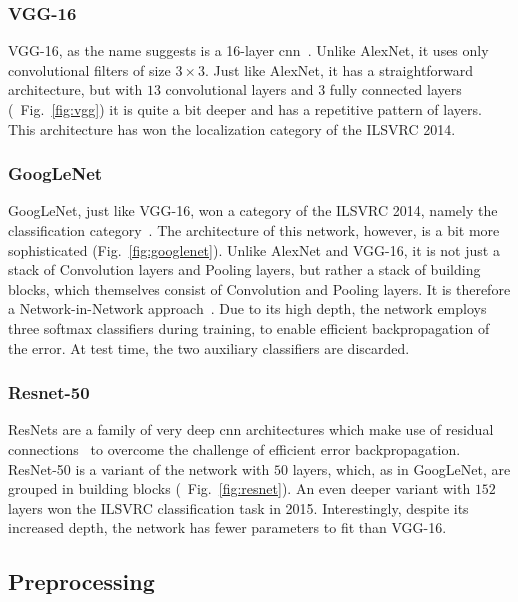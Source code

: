 \subsubsection{\textbf{VGG-16}}
VGG-16, as the name suggests is a 16-layer \ac{cnn}~\cite{simonyan2014very}. Unlike AlexNet, it uses only convolutional filters of size $3\times3$. Just like AlexNet, it has a straightforward architecture, but with $13$ convolutional layers and $3$ fully connected layers (\cf~Fig.~\ref{fig:vgg}) it is quite a bit deeper and has a repetitive pattern of layers. This architecture has won the localization category of the ILSVRC 2014.

\subsubsection{\textbf{GoogLeNet}}
GoogLeNet, just like VGG-16, won a category of the ILSVRC 2014, namely the classification category~\cite{szegedy2015going}. The architecture of this network, however, is a bit more sophisticated (\cf Fig.~\ref{fig:googlenet}). Unlike AlexNet and VGG-16, it is not just a stack of Convolution layers and Pooling layers, but rather a stack of building blocks, which themselves consist of Convolution and Pooling layers. It is therefore a Network-in-Network approach~\cite{lin2013network}. Due to its high depth, the network employs three softmax classifiers during training, to enable efficient backpropagation of the error. At test time, the two auxiliary classifiers are discarded.

\subsubsection{\textbf{Resnet-50}}
ResNets are a family of very deep \ac{cnn} architectures which make use of residual connections~\cite{he2016deep} to overcome the challenge of efficient error backpropagation. ResNet-50 is a variant of the network with $50$ layers, which, as in GoogLeNet, are grouped in building blocks (\cf~Fig.~\ref{fig:resnet}). An even deeper variant with $152$ layers won the ILSVRC classification task in 2015. Interestingly, despite its increased depth, the network has fewer parameters to fit than VGG-16.




\subsection{Preprocessing}

